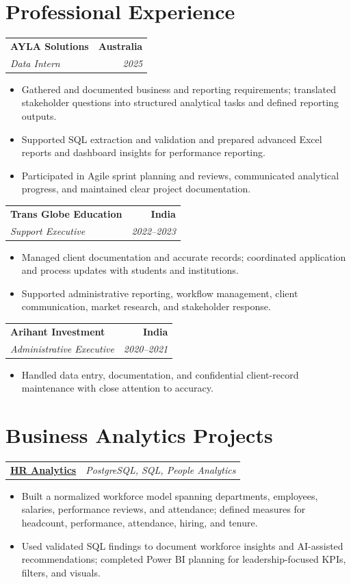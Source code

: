 \documentclass[letterpaper,10pt]{article}
\makeatletter
\newcommand{\role}[4]{%
  \begin{tabularx}{\textwidth}{@{}Xr@{}}
    \textbf{#1} & \textbf{#2} \\
    \textit{#3} & \textit{#4}
  \end{tabularx}\vspace{-1pt}
}
\newcommand{\project}[2]{%
  \begin{tabularx}{\textwidth}{@{}Xr@{}}
    \textbf{#1} & \textit{#2}
  \end{tabularx}\vspace{-1pt}
}
\makeatother
\begin{document}
\section{Professional Experience}
\role{AYLA Solutions}{Australia}{Data Intern}{2025}
\begin{itemize}
  \item Gathered and documented business and reporting requirements; translated stakeholder questions into structured analytical tasks and defined reporting outputs.
  \item Supported SQL extraction and validation and prepared advanced Excel reports and dashboard insights for performance reporting.
  \item Participated in Agile sprint planning and reviews, communicated analytical progress, and maintained clear project documentation.
\end{itemize}
\vspace{1pt}

\role{Trans Globe Education}{India}{Support Executive}{2022--2023}
\begin{itemize}
  \item Managed client documentation and accurate records; coordinated application and process updates with students and institutions.
  \item Supported administrative reporting, workflow management, client communication, market research, and stakeholder response.
\end{itemize}
\vspace{1pt}

\role{Arihant Investment}{India}{Administrative Executive}{2020--2021}
\begin{itemize}
  \item Handled data entry, documentation, and confidential client-record maintenance with close attention to accuracy.
\end{itemize}

\section{Business Analytics Projects}
\project{\href{https://github.com/jainalimehta/HR-Analytics}{HR Analytics}}{PostgreSQL, SQL, People Analytics}
\begin{itemize}
  \item Built a normalized workforce model spanning departments, employees, salaries, performance reviews, and attendance; defined measures for headcount, performance, attendance, hiring, and tenure.
  \item Used validated SQL findings to document workforce insights and AI-assisted recommendations; completed Power BI planning for leadership-focused KPIs, filters, and visuals.
\end{itemize}
\vspace{1pt}
\end{document}
